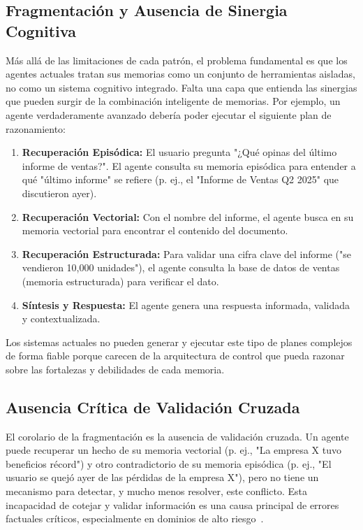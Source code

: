 \documentclass[conference]{IEEEtran}
\begin{document}
\subsection{Fragmentación y Ausencia de Sinergia Cognitiva}
Más allá de las limitaciones de cada patrón, el problema fundamental es que los agentes actuales tratan sus memorias como un conjunto de herramientas aisladas, no como un sistema cognitivo integrado. Falta una capa que entienda las sinergias que pueden surgir de la combinación inteligente de memorias. Por ejemplo, un agente verdaderamente avanzado debería poder ejecutar el siguiente plan de razonamiento:
\begin{enumerate}
    \item \textbf{Recuperación Episódica:} El usuario pregunta "¿Qué opinas del último informe de ventas?". El agente consulta su memoria episódica para entender a qué "último informe" se refiere (p. ej., el "Informe de Ventas Q2 2025" que discutieron ayer).
    \item \textbf{Recuperación Vectorial:} Con el nombre del informe, el agente busca en su memoria vectorial para encontrar el contenido del documento.
    \item \textbf{Recuperación Estructurada:} Para validar una cifra clave del informe ("se vendieron 10,000 unidades"), el agente consulta la base de datos de ventas (memoria estructurada) para verificar el dato.
    \item \textbf{Síntesis y Respuesta:} El agente genera una respuesta informada, validada y contextualizada.
\end{enumerate}
Los sistemas actuales no pueden generar y ejecutar este tipo de planes complejos de forma fiable porque carecen de la arquitectura de control que pueda razonar sobre las fortalezas y debilidades de cada memoria.

\subsection{Ausencia Crítica de Validación Cruzada}
El corolario de la fragmentación es la ausencia de validación cruzada. Un agente puede recuperar un hecho de su memoria vectorial (p. ej., "La empresa X tuvo beneficios récord") y otro contradictorio de su memoria episódica (p. ej., "El usuario se quejó ayer de las pérdidas de la empresa X"), pero no tiene un mecanismo para detectar, y mucho menos resolver, este conflicto. Esta incapacidad de cotejar y validar información es una causa principal de errores factuales críticos, especialmente en dominios de alto riesgo~\cite{zhang2024survey}.
\end{document}
